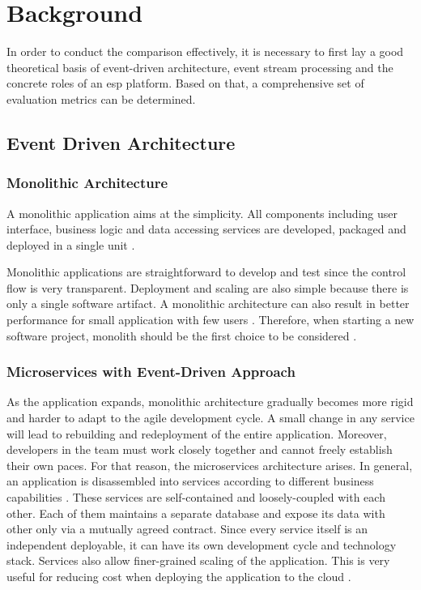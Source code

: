 \chapter{Background} \label{chap:background}
In order to conduct the comparison effectively, it is necessary to first lay a good theoretical basis of event-driven architecture, event stream processing and the concrete roles of an \acrlong{esp} platform. Based on that, a comprehensive set of evaluation metrics can be determined.


\section{Event Driven Architecture}
\subsection{Monolithic Architecture}
A monolithic application aims at the simplicity. All components including user interface, business logic and data accessing services are developed, packaged and deployed in a single unit \cite{monolith}.

Monolithic applications are straightforward to develop and test since the control flow is very transparent. Deployment and scaling are also simple because there is only a single software artifact. A monolithic architecture can also result in better performance for small application with few users \cite{al2018comparative}. Therefore, when starting a new software project, monolith should be the first choice to be considered \cite{monolithfirst}. 

\subsection{Microservices with Event-Driven Approach}
As the application expands, monolithic architecture gradually becomes more rigid and harder to adapt to the agile development cycle. A small change in any service will lead to rebuilding and redeployment of the entire application. Moreover, developers in the team must work closely together and cannot freely establish their own paces. For that reason, the microservices architecture arises. In general, an application is disassembled into services according to different business capabilities \cite{microservicesfowler}. These services are self-contained and loosely-coupled with each other. Each of them maintains a separate database and expose its data with other only via a mutually agreed contract. Since every service itself is an independent deployable, it can have its own development cycle and technology stack. Services also allow finer-grained scaling of the application. This is very useful for reducing cost when deploying the application to the cloud \cite{villamizar2016infrastructure}.

